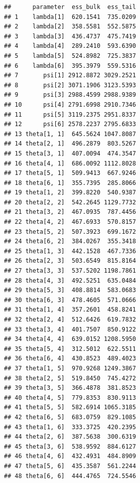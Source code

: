 \documentclass[
]{article}
\newenvironment{Shaded}{\begin{snugshade}}{\end{snugshade}}
\newcommand{\AttributeTok}[1]{\textcolor[rgb]{0.13,0.29,0.53}{#1}}
\newcommand{\CommentTok}[1]{\textcolor[rgb]{0.56,0.35,0.01}{\textit{#1}}}
\newcommand{\ControlFlowTok}[1]{\textcolor[rgb]{0.13,0.29,0.53}{\textbf{#1}}}
\newcommand{\DecValTok}[1]{\textcolor[rgb]{0.00,0.00,0.81}{#1}}
\newcommand{\FunctionTok}[1]{\textcolor[rgb]{0.13,0.29,0.53}{\textbf{#1}}}
\newcommand{\NormalTok}[1]{#1}
\newcommand{\OtherTok}[1]{\textcolor[rgb]{0.56,0.35,0.01}{#1}}
\newcommand{\SpecialCharTok}[1]{\textcolor[rgb]{0.81,0.36,0.00}{\textbf{#1}}}
\begin{document}
\linespread{1}

\begin{Shaded}
\end{Shaded}

\begin{verbatim}
##      parameter  ess_bulk  ess_tail
## 1    lambda[1]  620.1541  735.0209
## 2    lambda[2]  358.5581  552.5875
## 3    lambda[3]  436.4737  475.7419
## 4    lambda[4]  289.2410  593.6390
## 5    lambda[5]  524.8982  725.3837
## 6    lambda[6]  395.3979  559.5316
## 7       psi[1] 2912.8872 3029.2521
## 8       psi[2] 3071.1906 3123.5393
## 9       psi[3] 2988.4599 2988.9389
## 10      psi[4] 2791.6998 2910.7346
## 11      psi[5] 3119.2375 2951.8337
## 12      psi[6] 2578.2237 2795.6833
## 13 theta[1, 1]  645.5624 1047.8087
## 14 theta[2, 1]  496.2879  803.5267
## 15 theta[3, 1]  407.0094  474.3547
## 16 theta[4, 1]  686.0092 1112.8028
## 17 theta[5, 1]  509.9413  667.9246
## 18 theta[6, 1]  355.7395  285.8066
## 19 theta[1, 2]  399.8220  540.9387
## 20 theta[2, 2]  542.2645 1129.7732
## 21 theta[3, 2]  467.0935  787.4456
## 22 theta[4, 2]  467.6933  570.8157
## 23 theta[5, 2]  507.3923  699.1672
## 24 theta[6, 2]  384.0267  355.3418
## 25 theta[1, 3]  442.1528  467.7336
## 26 theta[2, 3]  503.6549  815.8164
## 27 theta[3, 3]  537.5202 1198.7861
## 28 theta[4, 3]  492.5251  635.0484
## 29 theta[5, 3]  408.8814  583.0683
## 30 theta[6, 3]  478.4605  571.0666
## 31 theta[1, 4]  357.2601  458.8241
## 32 theta[2, 4]  512.6426  619.7832
## 33 theta[3, 4]  401.7507  850.9122
## 34 theta[4, 4]  639.0152 1208.5950
## 35 theta[5, 4]  312.5012  622.5511
## 36 theta[6, 4]  430.8523  489.4023
## 37 theta[1, 5]  970.9268 1249.3867
## 38 theta[2, 5]  519.8450  745.4272
## 39 theta[3, 5]  366.4878  381.8523
## 40 theta[4, 5]  779.8353  830.9113
## 41 theta[5, 5]  582.6914 1065.3185
## 42 theta[6, 5]  683.0759  829.1085
## 43 theta[1, 6]  333.3725  420.2395
## 44 theta[2, 6]  387.5638  300.6319
## 45 theta[3, 6]  538.9592  884.6127
## 46 theta[4, 6]  432.4931  484.8909
## 47 theta[5, 6]  435.3587  561.2244
## 48 theta[6, 6]  444.4765  724.5546
\end{verbatim}
\end{document}
